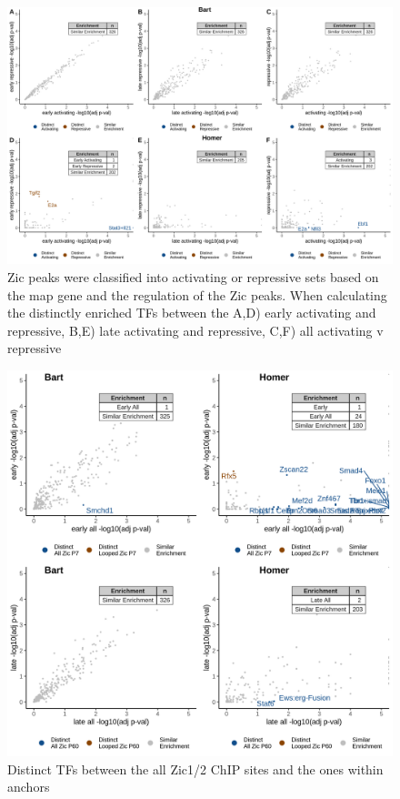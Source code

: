 \documentclass[fleqn,10pt,twocolumn]{wlscirep}
\begin{document}
\begin{figure}[ht]
\centering
\includegraphics[width=.95\textwidth]{Figures/supp_figure_rrho.png}
\caption{Zic peaks were classified into activating or repressive sets based on the map gene and the regulation of the Zic peaks. When calculating the distinctly enriched TFs between the A,D) early activating and repressive, B,E) late activating and repressive, C,F) all activating v repressive}
\label{fig:ActvRep}
\end{figure}

\begin{figure}[ht]
\centering
\includegraphics[width=.95\textwidth]{Figures/supp_figure_rrho_allvlooped.png}
\caption{Distinct TFs between the all Zic1/2 ChIP sites and the ones within anchors}
\label{fig:loopved_all}
\end{figure}
\end{document}
